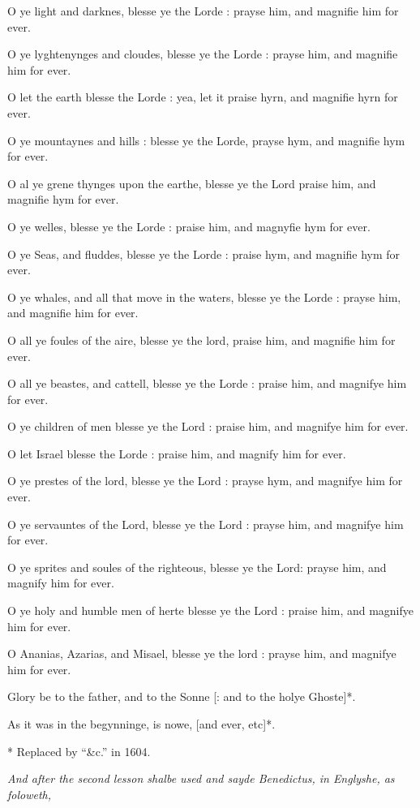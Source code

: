 O ye light and darknes, blesse ye the Lorde : prayse
him, and magnifie him for ever. 

O ye lyghtenynges and cloudes, blesse ye the Lorde
: prayse him, and magnifie him for ever. 

O let the earth blesse the Lorde : yea, let it praise
hyrn, and magnifie hyrn for ever. 

O ye mountaynes and hills : blesse ye the Lorde, prayse
hym, and magnifie hym for ever. 

O al ye grene thynges upon the earthe, blesse ye the
Lord praise him, and magnifie hym for ever. 

O ye welles, blesse ye the Lorde : praise him, and
magnyfie hym for ever. 

O ye Seas, and fluddes, blesse ye the Lorde : praise
hym, and magnifie hym for ever. 

O ye whales, and all that move in the waters, blesse
ye the Lorde : prayse him, and magnifie him for ever. 

O all ye foules of the aire, blesse ye the lord,
praise him, and magnifie him for ever. 

O all ye beastes, and cattell, blesse ye the Lorde
: praise him, and magnifye him for ever.

O ye children of men blesse ye the Lord : praise him,
and magnifye him for ever. 

O let Israel blesse the Lorde : praise him, and magnify
him for ever. 

O ye prestes of the lord, blesse ye the Lord : prayse
hym, and magnifye him for ever. 

O ye servauntes of the Lord, blesse ye the Lord : prayse
him, and magnifye him for ever. 

O ye sprites and soules of the righteous, blesse ye
the Lord: prayse him, and magnify him for ever. 

O ye holy and humble men of herte blesse ye the Lord
: praise him, and magnifye him for ever. 

O Ananias, Azarias, and Misael, blesse ye the lord
: prayse him, and magnifye him for ever. 

Glory be to the father, and to the Sonne [: and to
the holye Ghoste]*. 

As it was in the begynninge, is nowe, [and ever, etc]*.

*
Replaced by ``\&c.''
in 1604.

\emph{And after the second lesson shalbe used and sayde Benedictus, in Englyshe,
as foloweth,}

